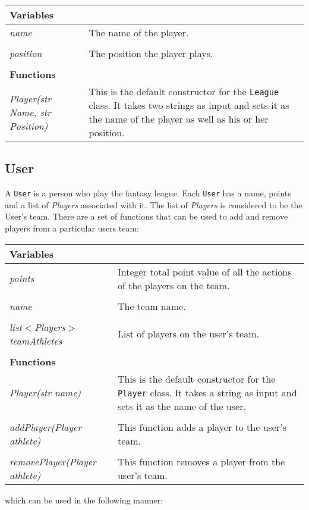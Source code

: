 \documentclass[12pt]{report}
\begin{document}
\begin{doublespace}
\begin{flushleft}
\begin{onehalfspace}
\begin{tabular}{ l | p{10cm} }
\hline
\textbf{Variables} & \\
\hline
\textit{name} & The name of the player. \\
\\
\textit{position} & The position the player plays. \\
\\
\hline
\textbf{Functions} & \\
\hline
\textit{Player(str Name, str Position)} & This is the default constructor for the \texttt{League} class. It takes two strings as input and sets it as the name of the player as well as his or her position. \\
\hline
\end{tabular}
\end{onehalfspace}
\end{flushleft}

\subsection{User}
A \texttt{User} is a person who play the fantasy league. Each \texttt{User} has a name, points and a list of \textit{Players} associated with it. The list of \textit{Players} is considered to be the User's team. There are a set of functions that can be used to add and remove players from a particular users team:

\begin{flushleft}
\begin{onehalfspace}
\begin{tabular}{ p{5.5cm} | p{10cm} }
\hline
\textbf{Variables} & \\
\hline
\textit{points} & Integer total point value of all the actions of the players on the team. \\
\\
\textit{name} & The team name. \\
\\
\textit{list$<$Players$>$ teamAthletes} & List of players on the user's team. \\
\\
\hline
\textbf{Functions} & \\
\hline
\textit{Player(str name)} & This is the default constructor for the \texttt{Player} class. It takes a string as input and sets it as the name of the user. \\
\\
\textit{addPlayer(Player athlete)} & This function adds a player to the user's team. \\
\\
\textit{removePlayer(Player athlete)} & This function removes a player from the user's team. \\
\hline
\end{tabular}
\end{onehalfspace}
\end{flushleft}
which can be used in the following manner:
\end{doublespace}
\end{document}
